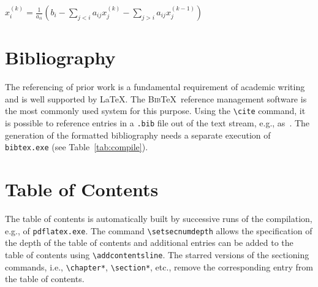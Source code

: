 \begin{algorithm}
  {
     {
        $x_i^{(k)} = \frac{1}{a_{ii}} \left(b_i-\sum_{j<i} a_{ij} x_j^{(k)} - \sum_{j>i} a_{ij} x_j^{(k-1)} \right)$\;
     }
     {\BreakFor\;}
  }
  \caption{Gauss-Seidel}
  \label{alg:gauss-seidel} %
\end{algorithm}

\section{Bibliography}

The referencing of prior work is a fundamental requirement of academic writing and is well supported by \LaTeX.
The \textsc{Bib}\TeX\ reference management software is the most commonly used system for this purpose.
Using the \verb|\cite| command, it is possible to reference entries in a \verb|.bib| file out of the text stream, e.g., as~\cite{Turing1936}.
The generation of the formatted bibliography needs a separate execution of \verb|bibtex.exe| (see Table~\ref{tab:compile}).

\section{Table of Contents}

The table of contents is automatically built by successive runs of the compilation, e.g., of \verb|pdflatex.exe|.
The command \verb|\setsecnumdepth| allows the specification of the depth of the table of contents and additional entries can be added to the table of contents using \verb|\addcontentsline|.
The starred versions of the sectioning commands, i.e., \verb|\chapter*|, \verb|\section*|, etc., remove the corresponding entry from the table of contents.

